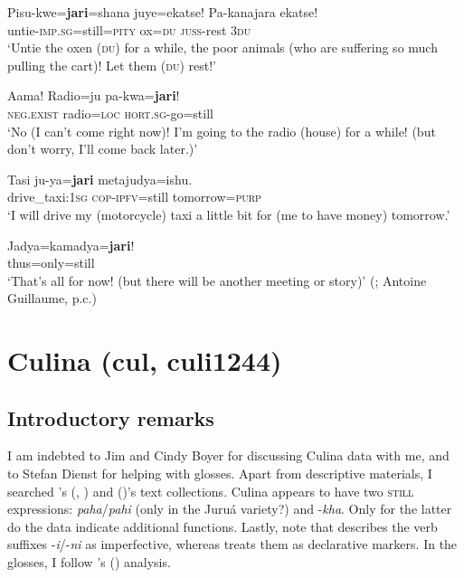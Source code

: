 \begin{exe}
	\ex\label{exAppendixCavinenaForAWhile1}
	\gll Pisu-kwe=\textbf{jari}=shana juye=ekatse! Pa-kanajara ekatse!\\
	untie-\textsc{imp}.\textsc{sg}=still=\textsc{pity} ox=\textsc{du} \textsc{juss}-rest 3\textsc{du}\\
	\glt \lq Untie the oxen (\textsc{du}) for a while, the poor animals (who are suffering so much pulling the cart)! Let them  (\textsc{du}) rest!' \parencite[655]{Guillaume2008}
		
	\ex\label{exAppendixCavinenaForAWhile2}
	\gll Aama! Radio=ju pa-kwa=\textbf{jari}!\\
	\textsc{neg}.\textsc{exist} radio=\textsc{loc} \textsc{hort}.\textsc{sg}-go=still\\
	\glt \lq No (I can't come right now)! I'm going to the radio (house) for a while! (but don't worry, I'll come back later.)' \parencite[662]{Guillaume2008}
	
	\ex\label{exAppendixCavinenaForAWhile3}
	\gll Tasi ju-ya=\textbf{jari} metajudya=ishu.\\
	drive\_taxi:1\textsc{sg} \textsc{cop}-\textsc{ipfv}=still tomorrow=\textsc{purp}\\
	\glt \lq I will drive my (motorcycle) taxi a little bit for (me to have money) tomorrow.' \parencite[662]{Guillaume2008}

	\ex\label{exAppendixCavinenaForAWhile4}
	\gll Jadya=kamadya=\textbf{jari}!\\
	thus=only=still\\
	\glt \lq That's all for now! (but there will be another meeting or story)' (\cite[662]{Guillaume2008}; Antoine Guillaume, p.c.)
\end{exe}

\section{Culina (cul, culi1244)}
\label{appendixCulina}
\subsection{Introductory remarks}
I am indebted to Jim and Cindy Boyer for discussing Culina data with me, and to Stefan Dienst for helping with glosses. Apart from descriptive materials, I searched \citeauthor{Boyer1990}'s (\citeyear{Boyer1990}, \citeyear{Boyer2001}) and \citeauthor{Boyer1999} (\citeyear{Boyer1999})'s text collections.  Culina appears to have two \textsc{still} expressions: \textit{paha}/\textit{pahi} (only in the Juruá variety?) and \mbox{-\textit{kha}}. Only for the latter do the data indicate additional functions. Lastly, note that \textcite{Tiss2004} describes the verb suffixes -\textit{i}/-\textit{ni} as imperfective, whereas \textcite{Dienst2014} treats them as declarative markers. In the glosses, I follow \citeauthor{Dienst2014}'s (\citeyear{Dienst2014}) analysis.

